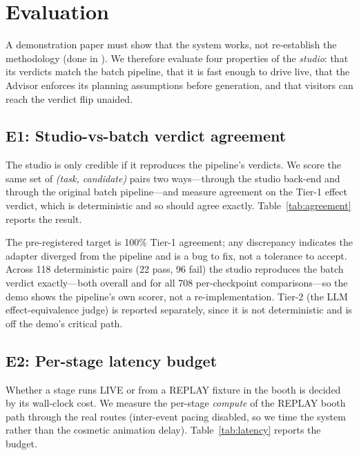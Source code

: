 \section{Evaluation}
\label{sec:eval}

A demonstration paper must show that the system works, not re-establish the
methodology (done in \citealp{dynamicmcpbench2026}). We therefore evaluate
four properties of the \emph{studio}: that its verdicts match the batch
pipeline, that it is fast enough to drive live, that the Advisor enforces its
planning assumptions before generation, and that visitors can reach the verdict
flip unaided.

\subsection{E1: Studio-vs-batch verdict agreement}

The studio is only credible if it reproduces the pipeline's verdicts. We
score the same set of \emph{(task, candidate)} pairs two ways---through the
studio back-end and through the original batch pipeline---and measure
agreement on the Tier-1 effect verdict, which is deterministic and so should
agree exactly. Table~\ref{tab:agreement} reports the result.



\noindent The pre-registered target is 100\% Tier-1 agreement; any
discrepancy indicates the adapter diverged from the pipeline and is a bug to
fix, not a tolerance to accept. Across 118 deterministic pairs (22 pass, 96
fail) the studio reproduces the batch verdict exactly---both overall and for
all 708 per-checkpoint comparisons---so the demo shows the pipeline's own
scorer, not a re-implementation. Tier-2 (the LLM effect-equivalence judge) is
reported separately, since it is not deterministic and is off the demo's
critical path.

\subsection{E2: Per-stage latency budget}

Whether a stage runs LIVE or from a REPLAY fixture in the booth is decided
by its wall-clock cost. We measure the per-stage \emph{compute} of the REPLAY
booth path through the real routes (inter-event pacing disabled, so we time
the system rather than the cosmetic animation delay).
Table~\ref{tab:latency} reports the budget.



